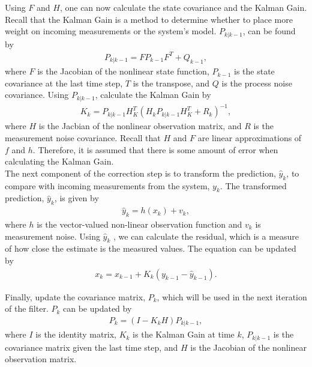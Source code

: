 \begin{enumerate}
  \noindent Using $F$ and $H$, one can now calculate the state covariance and the Kalman Gain.  Recall that the Kalman Gain is a method to determine whether to place more weight on incoming measurements or the system's model. $P_{k | k - 1}$, can be found by
    \begin{align*} 
        P_{k | k -1} = F P_{k - 1} F^T + Q_{k-1} ,
        \end{align*}
       where $F$ is the Jacobian of the nonlinear state function, $P_{k - 1} $ is the state covariance at the last time step, $T$ is the transpose, and $Q$ is the process noise covariance. Using $P_{k | k - 1}$, calculate the Kalman Gain by
         \begin{align*} 
        K_k = P_{k | k - 1} H^T_K (H_k P_{k | k - 1} H^T_K + R_k)^{-1},
    \end{align*}
    where $H$ is the Jacbian of the nonlinear observation matrix, and $R$ is the measurement noise covariance.
    Recall that $H$ and $F$ are linear approximations of $f$ and $h$. Therefore, it is assumed that there is some amount of error when calculating the Kalman Gain. \\
 
    \noindent  The next component of the correction step is to transform the prediction, $\hat y_k$, to compare with incoming measurements from the system, $y_k$. The transformed prediction, $\hat y_k$, is given by
    \begin{align*}
        \hat y_k = h( x_k ) + v_k,
    \end{align*}
   where $h$ is the vector-valued non-linear observation function and $v_k$ is measurement noise. Using $\hat y_k$ , we can calculate the residual, which is a measure of how close the estimate is the measured values. The equation can be updated by 
     \begin{align*} 
        x_k = x_{k - 1} + K_k(y_{k-1} - \hat y_{k-1}).
    \end{align*}
    
    \noindent Finally, update the covariance matrix, $P_k $, which will be used in the next iteration of the filter. $P_k $ can be updated by
    \begin{align*} 
        P_k = (I - K_k H) P_{k | k-1},
    \end{align*}
    where $I$ is the identity matrix, $K_k$ is the Kalman Gain at time $k$, $P_{k | k-1}$ is the covariance matrix given the last time step, and $H$ is the Jacobian of the nonlinear observation matrix.
\end{enumerate} 

